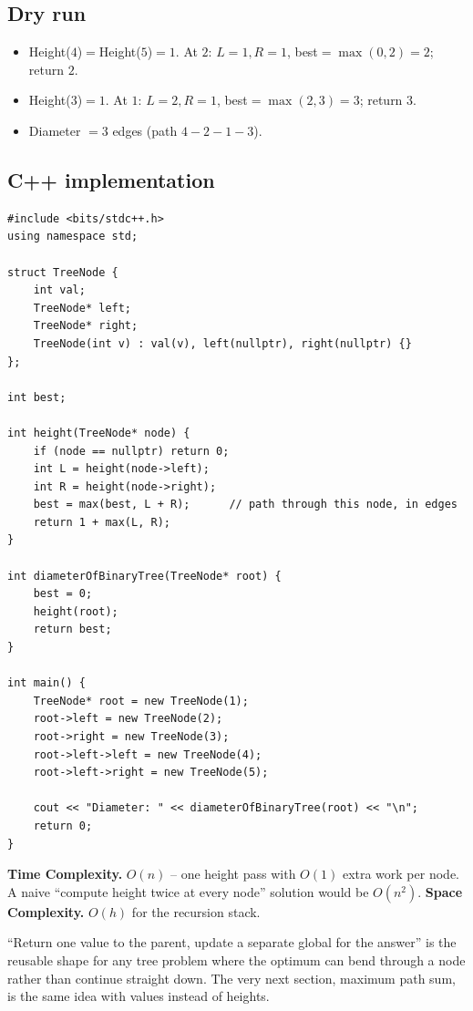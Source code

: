 \subsection*{Dry run}


\begin{itemize}
  \item Height($4$)$=$Height($5$)$=1$. At $2$: $L=1,R=1$, best$=\max(0,2)=2$;
        return $2$.
  \item Height($3$)$=1$. At $1$: $L=2,R=1$, best$=\max(2,3)=3$; return
        $3$.
  \item Diameter $=3$ edges (path $4\!-\!2\!-\!1\!-\!3$).
\end{itemize}

\subsection*{C++ implementation}

\begin{lstlisting}
#include <bits/stdc++.h>
using namespace std;

struct TreeNode {
    int val;
    TreeNode* left;
    TreeNode* right;
    TreeNode(int v) : val(v), left(nullptr), right(nullptr) {}
};

int best;

int height(TreeNode* node) {
    if (node == nullptr) return 0;
    int L = height(node->left);
    int R = height(node->right);
    best = max(best, L + R);      // path through this node, in edges
    return 1 + max(L, R);
}

int diameterOfBinaryTree(TreeNode* root) {
    best = 0;
    height(root);
    return best;
}

int main() {
    TreeNode* root = new TreeNode(1);
    root->left = new TreeNode(2);
    root->right = new TreeNode(3);
    root->left->left = new TreeNode(4);
    root->left->right = new TreeNode(5);

    cout << "Diameter: " << diameterOfBinaryTree(root) << "\n";
    return 0;
}
\end{lstlisting}

\begin{complexitybox}
\textbf{Time Complexity.} $O(n)$ -- one height pass with $O(1)$ extra work
per node. A naive ``compute height twice at every node'' solution would be
$O(n^2)$. \textbf{Space Complexity.} $O(h)$ for the recursion stack.
\end{complexitybox}

\begin{takeawaybox}
``Return one value to the parent, update a separate global for the answer''
is the reusable shape for any tree problem where the optimum can bend
through a node rather than continue straight down. The very next section,
maximum path sum, is the same idea with values instead of heights.
\end{takeawaybox}
